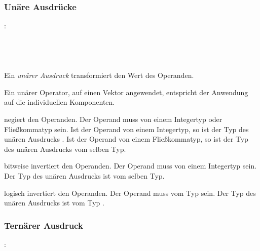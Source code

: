 \subsubsection{Unäre Ausdrücke}\label{Unaere Ausdruecke}
:\label{asdr_unaer}\\
\hspace*{1cm}\glq\Gt{$\sim$}\grq  {} \\
\hspace*{1cm}\glq\Gt{-}\grq  {} \\
\hspace*{1cm}\glq\Gt{!}\grq  {} \\
\hspace*{1cm} \\

Ein \emph{unärer Ausdruck} transformiert den Wert des Operanden.

Ein unärer Operator, auf einen Vektor angewendet, entspricht der Anwendung auf die individuellen Komponenten.

\op{-} negiert den Operanden. Der Operand muss von einem Integertyp oder Fließkommatyp sein.
Ist der Operand von einem Integertyp, so ist der Typ des unären Ausdrucks .
Ist der Operand von einem Fließkommatyp, so ist der Typ des unären Ausdrucks vom selben Typ.

\op{$\sim$} bitweise invertiert den Operanden. Der Operand muss von einem Integertyp sein. Der Typ des unären Ausdrucks ist vom selben Typ.

\op{!} logisch invertiert den Operanden. Der Operand muss vom Typ  sein. Der Typ des unären Ausdrucks ist vom Typ .

\subsubsection{Ternärer Ausdruck}\label{Ternaerer Ausdruck}
:\label{asdr_ternaer}\\
\hspace*{1cm} \\
\hspace*{1cm} \glq{}\grq  {}  \glq\Gt{:}\grq  {} \\

